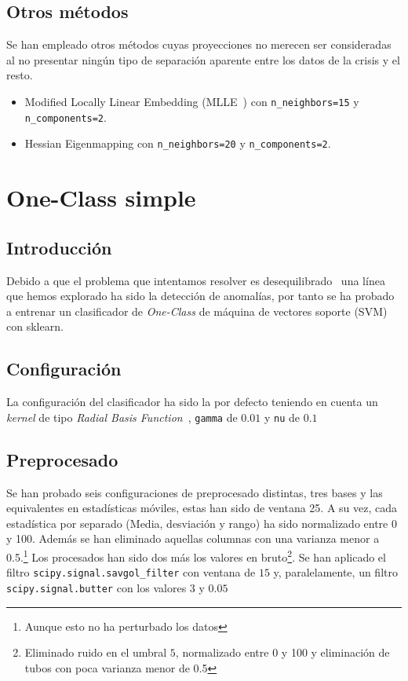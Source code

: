 \documentclass[a4paper,12pt,twoside,oldfontcommands]{memoir}
\begin{document}
\section{Otros métodos}
Se han empleado otros métodos cuyas proyecciones no merecen ser consideradas al no presentar ningún tipo de separación aparente entre los datos de la crisis y el resto. 
\begin{itemize}
    \item Modified Locally Linear Embedding (MLLE~\cite{zhang2007mlle}) con \texttt{n\_neighbors=15} y \texttt{n\_components=2}.
    \item Hessian Eigenmapping con \texttt{n\_neighbors=20} y \texttt{n\_components=2}. 
\end{itemize}
\chapter{One-Class simple}
\section{Introducción}
Debido a que el problema que intentamos resolver es desequilibrado~\cite{galar2012review} una línea que hemos explorado ha sido la detección de anomalías, por tanto se ha probado a entrenar un clasificador de \textit{One-Class} de máquina de vectores soporte (SVM) con sklearn.
\section{Configuración}
La configuración del clasificador ha sido la por defecto teniendo en cuenta un \textit{kernel} de tipo \textit{Radial Basis Function}~\cite{wiki:rbf}, \texttt{gamma} de \(0.01\) y \texttt{nu} de \(0.1\) 
\section{Preprocesado}
Se han probado seis configuraciones de preprocesado distintas, tres bases y las equivalentes en estadísticas móviles, estas han sido de ventana 25. A su vez, cada estadística por separado (Media, desviación y rango) ha sido normalizado entre 0 y 100. Además se han eliminado aquellas columnas con una varianza menor a 0.5.\footnote{Aunque esto no ha perturbado los datos}
Los procesados han sido dos más los valores en bruto\footnote{Eliminado ruido en el umbral \(5\), normalizado entre 0 y 100 y eliminación de tubos con poca varianza menor de 0.5}. Se han aplicado el filtro \texttt{scipy.signal.savgol\_filter} con ventana de \(15\) y, paralelamente, un filtro \texttt{scipy.signal.butter} con los valores \(3\) y \(0.05\)
\end{document}
